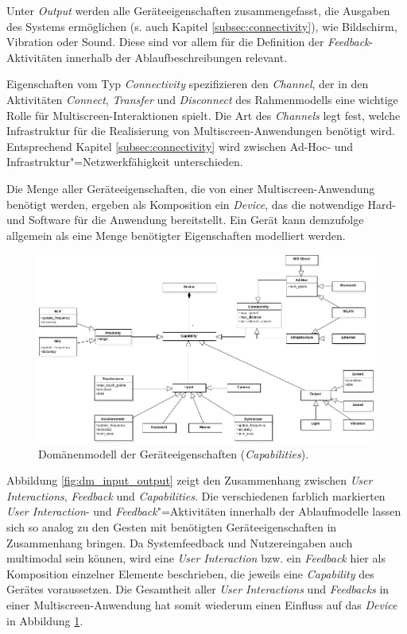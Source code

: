 Unter \textit{Output} werden alle Geräteeigenschaften zusammengefasst, die Ausgaben des Systems ermöglichen (s. auch Kapitel \ref{subsec:connectivity}), wie \zb Bildschirm, Vibration oder Sound. Diese sind vor allem für die Definition der \textit{Feedback}-Aktivitäten innerhalb der Ablaufbeschreibungen relevant.

Eigenschaften vom Typ \textit{Connectivity} spezifizieren den \textit{Channel}, der in den Aktivitäten \textit{Connect}, \textit{Transfer} und \textit{Disconnect} des Rahmenmodells eine wichtige Rolle für Multiscreen-Interaktionen spielt. Die Art des \textit{Channels} legt fest, welche Infrastruktur für die Realisierung von Multiscreen-Anwendungen benötigt wird. Entsprechend Kapitel \ref{subsec:connectivity} wird zwischen Ad-Hoc- und Infrastruktur"=Netzwerkfähigkeit unterschieden.

Die Menge aller Geräteeigenschaften, die von einer Multiscreen-Anwendung benötigt werden, ergeben als Komposition ein \textit{Device}, das die notwendige Hard- und Software für die Anwendung bereitstellt. Ein Gerät kann demzufolge allgemein als eine Menge benötigter Eigenschaften modelliert werden.

\begin{figure}
\centering
\includegraphics[page=1, width=\textwidth, height=0.58\textheight]{bilder/domain_model.pdf}
\caption{Domänenmodell der Geräteeigenschaften (\textit{Capabilities}).}
\label{fig:dm_capabilities}
\end{figure}

Abbildung \ref{fig:dm_input_output} zeigt den Zusammenhang zwischen \textit{User Interactions}, \textit{Feedback} und \textit{Capabilities}. Die verschiedenen farblich markierten \textit{User Interaction}- und \textit{Feedback}"=Aktivitäten innerhalb der Ablaufmodelle lassen sich so analog zu den Gesten mit benötigten Geräteeigenschaften in Zusammenhang bringen. Da Systemfeedback und Nutzereingaben auch multimodal sein können, wird eine \textit{User Interaction} bzw. ein \textit{Feedback} hier als Komposition einzelner Elemente beschrieben, die jeweils eine \textit{Capability} des Gerätes voraussetzen. Die Gesamtheit aller \textit{User Interactions} und \textit{Feedbacks} in einer Multiscreen-Anwendung hat somit wiederum einen Einfluss auf das \textit{Device} in Abbildung \ref{fig:dm_capabilities}.
 

